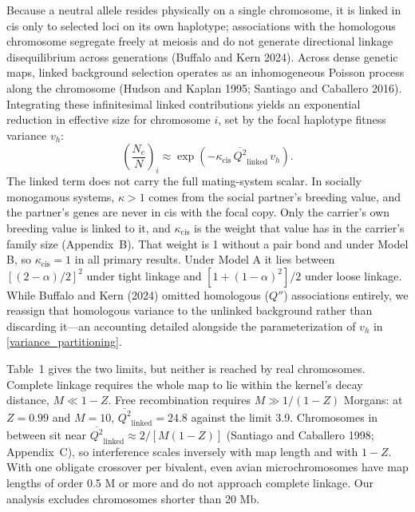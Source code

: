 \documentclass[12pt]{article}
\begin{document}
Because a neutral allele resides physically on a single chromosome, it is linked in cis only to selected loci on its own haplotype; associations with the homologous chromosome segregate freely at meiosis and do not generate directional linkage disequilibrium across generations (Buffalo and Kern 2024). Across dense genetic maps, linked background selection operates as an inhomogeneous Poisson process along the chromosome (Hudson and Kaplan 1995; Santiago and Caballero 2016). Integrating these infinitesimal linked contributions yields an exponential reduction in effective size for chromosome $i$, set by the focal haplotype fitness variance $v_h$:
\begin{equation}
\left(\frac{N_e}{N}\right)_i \approx \exp\left(-\kappa_\text{cis}\,\overline{Q^2}_\text{linked}\,v_h\right). \label{eq:ne_chrom}
\end{equation}
The linked term does not carry the full mating-system scalar. In socially monogamous systems, $\kappa > 1$ comes from the social partner's breeding value, and the partner's genes are never in cis with the focal copy. Only the carrier's own breeding value is linked to it, and $\kappa_\text{cis}$ is the weight that value has in the carrier's family size (Appendix~B). That weight is 1 without a pair bond and under Model B, so $\kappa_\text{cis} = 1$ in all primary results. Under Model A it lies between $[(2-\alpha)/2]^2$ under tight linkage and $[1+(1-\alpha)^2]/2$ under loose linkage.
While Buffalo and Kern (2024) omitted homologous ($Q''$) associations entirely, we reassign that homologous variance to the unlinked background rather than discarding it—an accounting detailed alongside the parameterization of $v_h$ in \autoref{variance_partitioning}.

Table~1 gives the two limits, but neither is reached by real chromosomes. Complete linkage requires the whole map to lie within the kernel's decay distance, $M \ll 1 - Z$. Free recombination requires $M \gg 1/(1-Z)$ Morgans: at $Z = 0.99$ and $M = 10$, $\overline{Q^2}_\text{linked} = 24.8$ against the limit 3.9. Chromosomes in between sit near $\overline{Q^2}_\text{linked} \approx 2/[M(1-Z)]$ (Santiago and Caballero 1998; Appendix~C), so interference scales inversely with map length and with $1 - Z$. With one obligate crossover per bivalent, even avian microchromosomes have map lengths of order 0.5 M or more and do not approach complete linkage. Our analysis excludes chromosomes shorter than 20 Mb.
\end{document}
